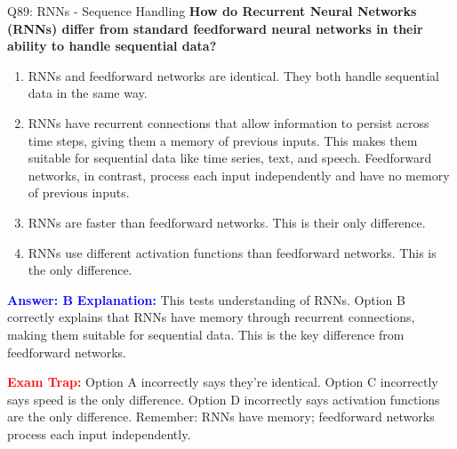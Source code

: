 \documentclass[8pt]{beamer}
\begin{document}
	\begin{frame}{Q89: RNNs - Sequence Handling}
		\fontsize{6.5}{7.5}\selectfont
		\textbf{How do Recurrent Neural Networks (RNNs) differ from standard feedforward neural networks in their ability to handle sequential data?}
		
		\begin{enumerate}
			\item RNNs and feedforward networks are identical. They both handle sequential data in the same way.
			\item RNNs have recurrent connections that allow information to persist across time steps, giving them a memory of previous inputs. This makes them suitable for sequential data like time series, text, and speech. Feedforward networks, in contrast, process each input independently and have no memory of previous inputs.
			\item RNNs are faster than feedforward networks. This is their only difference.
			\item RNNs use different activation functions than feedforward networks. This is the only difference.
		\end{enumerate}
		
		\vspace{0.1cm}
		\textcolor{blue}{\textbf{Answer: B}}
		\vspace{0.1cm}
		\textcolor{blue}{\textbf{Explanation:}} This tests understanding of RNNs. Option B correctly explains that RNNs have memory through recurrent connections, making them suitable for sequential data. This is the key difference from feedforward networks.
		
		\textcolor{red}{\textbf{Exam Trap:}} Option A incorrectly says they're identical. Option C incorrectly says speed is the only difference. Option D incorrectly says activation functions are the only difference. Remember: RNNs have memory; feedforward networks process each input independently.
	\end{frame}
	
\end{document}

